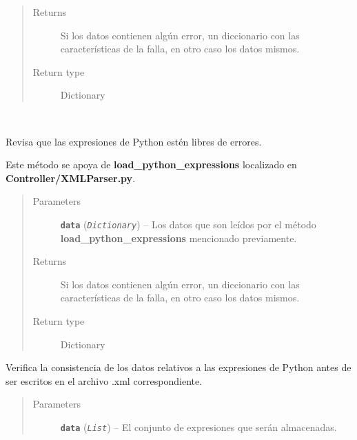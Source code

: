 \documentclass[letterpaper,10pt,english]{sphinxmanual}
\begin{document}
\begin{fulllineitems}
\begin{fulllineitems}
\begin{quote}
\begin{description}
\item[{Returns}] \leavevmode
Si los datos contienen algún error, un diccionario con las características
de la falla, en otro caso los datos mismos.

\item[{Return type}] \leavevmode
Dictionary

\end{description}\end{quote}

\end{fulllineitems}


\begin{fulllineitems}
\label{Controller/Verifier:Controller.Verifier.Verifier.verify_load_xml_python_expressions}~
\begin{DUlineblock}{0em}
\item[] Revisa que las expresiones de Python estén libres de errores.
\item[] Este método se apoya de \textbf{load\_python\_expressions} localizado en 
\textbf{Controller/XMLParser.py}.
\end{DUlineblock}
\begin{quote}\begin{description}
\item[{Parameters}] \leavevmode
\textbf{\texttt{data}} (\emph{\texttt{Dictionary}}) -- Los datos que son leídos por el método \textbf{load\_python\_expressions}
mencionado previamente.

\item[{Returns}] \leavevmode
Si los datos contienen algún error, un diccionario con las características
de la falla, en otro caso los datos mismos.

\item[{Return type}] \leavevmode
Dictionary

\end{description}\end{quote}

\end{fulllineitems}


\begin{fulllineitems}
\label{Controller/Verifier:Controller.Verifier.Verifier.verify_write_xml_python_expressions}
Verifica la consistencia de los datos relativos a las
expresiones de Python antes de ser escritos en el archivo .xml
correspondiente.
\begin{quote}\begin{description}
\item[{Parameters}] \leavevmode
\textbf{\texttt{data}} (\emph{\texttt{List}}) -- El conjunto de expresiones que serán almacenadas.


\end{description}
\end{quote}
\end{fulllineitems}
\end{fulllineitems}
\end{document}
